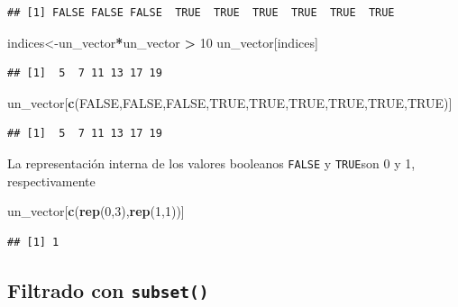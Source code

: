 \documentclass[
]{book}
\newenvironment{Shaded}{\begin{snugshade}}{\end{snugshade}}
\newcommand{\ConstantTok}[1]{\textcolor[rgb]{0.56,0.35,0.01}{#1}}
\newcommand{\DecValTok}[1]{\textcolor[rgb]{0.00,0.00,0.81}{#1}}
\newcommand{\FunctionTok}[1]{\textcolor[rgb]{0.13,0.29,0.53}{\textbf{#1}}}
\newcommand{\NormalTok}[1]{#1}
\newcommand{\OtherTok}[1]{\textcolor[rgb]{0.56,0.35,0.01}{#1}}
\newcommand{\SpecialCharTok}[1]{\textcolor[rgb]{0.81,0.36,0.00}{\textbf{#1}}}
\begin{document}
\begin{verbatim}
## [1] FALSE FALSE FALSE  TRUE  TRUE  TRUE  TRUE  TRUE  TRUE
\end{verbatim}

\begin{Shaded}
\begin{Highlighting}[]
\NormalTok{indices}\OtherTok{\textless{}{-}}\NormalTok{un\_vector}\SpecialCharTok{*}\NormalTok{un\_vector }\SpecialCharTok{\textgreater{}} \DecValTok{10} 
\NormalTok{un\_vector[indices]}
\end{Highlighting}
\end{Shaded}

\begin{verbatim}
## [1]  5  7 11 13 17 19
\end{verbatim}

\begin{Shaded}
\begin{Highlighting}[]
\NormalTok{un\_vector[}\FunctionTok{c}\NormalTok{(}\ConstantTok{FALSE}\NormalTok{,}\ConstantTok{FALSE}\NormalTok{,}\ConstantTok{FALSE}\NormalTok{,}\ConstantTok{TRUE}\NormalTok{,}\ConstantTok{TRUE}\NormalTok{,}\ConstantTok{TRUE}\NormalTok{,}\ConstantTok{TRUE}\NormalTok{,}\ConstantTok{TRUE}\NormalTok{,}\ConstantTok{TRUE}\NormalTok{)]}
\end{Highlighting}
\end{Shaded}

\begin{verbatim}
## [1]  5  7 11 13 17 19
\end{verbatim}

La representación interna de los valores booleanos \texttt{FALSE} y \texttt{TRUE}son 0 y 1, respectivamente

\begin{Shaded}
\begin{Highlighting}[]
\NormalTok{un\_vector[}\FunctionTok{c}\NormalTok{(}\FunctionTok{rep}\NormalTok{(}\DecValTok{0}\NormalTok{,}\DecValTok{3}\NormalTok{),}\FunctionTok{rep}\NormalTok{(}\DecValTok{1}\NormalTok{,}\DecValTok{1}\NormalTok{))]}
\end{Highlighting}
\end{Shaded}

\begin{verbatim}
## [1] 1
\end{verbatim}

\hypertarget{filtrado-con-subset}{%
\subsection{\texorpdfstring{Filtrado con \texttt{subset()}}{Filtrado con subset()}}\label{filtrado-con-subset}}
\end{document}
